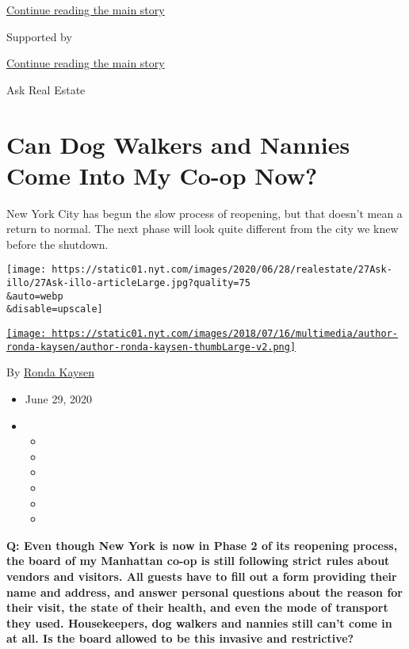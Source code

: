 \protect\hyperlink{after-top}{Continue reading the main story}

Supported by

\protect\hyperlink{after-sponsor}{Continue reading the main story}

Ask Real Estate

\hypertarget{can-dog-walkers-and-nannies-come-into-my-co-op-now}{%
\section{Can Dog Walkers and Nannies Come Into My Co-op
Now?}\label{can-dog-walkers-and-nannies-come-into-my-co-op-now}}

New York City has begun the slow process of reopening, but that doesn't
mean a return to normal. The next phase will look quite different from
the city we knew before the shutdown.

\texttt{[image: https://static01.nyt.com/images/2020/06/28/realestate/27Ask-illo/27Ask-illo-articleLarge.jpg?quality=75\\\&auto=webp\\\&disable=upscale]}

\href{https://www.nytimes.com/by/ronda-kaysen}{\texttt{[image: https://static01.nyt.com/images/2018/07/16/multimedia/author-ronda-kaysen/author-ronda-kaysen-thumbLarge-v2.png]}}

By \href{https://www.nytimes.com/by/ronda-kaysen}{Ronda Kaysen}

\begin{itemize}
\item
  June 29, 2020
\item
  \begin{itemize}
  \item
  \item
  \item
  \item
  \item
  \item
  \end{itemize}
\end{itemize}

\textbf{Q: Even though New York is now in Phase 2 of its reopening
process, the board of my Manhattan co-op is still following strict rules
about vendors and visitors. All guests have to fill out a form providing
their name and address, and answer personal questions about the reason
for their visit, the state of their health, and even the mode of
transport they used. Housekeepers, dog walkers and nannies still can't
come in at all. Is the board allowed to be this invasive and
restrictive?}

